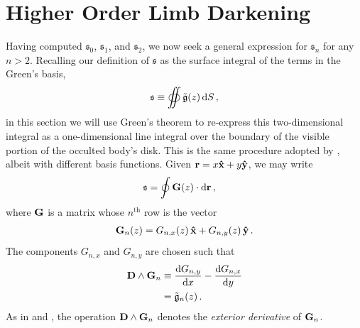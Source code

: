 \documentclass[modern,trackchanges]{aastex63}
\begin{document}
\section{Higher Order Limb Darkening}
\label{sec:higher_order}


Having computed $\mathfrak{s}_0$, $\mathfrak{s}_1$, and $\mathfrak{s}_2$,
we now seek a general expression for $\mathfrak{s}_n$ for any $n > 2$.
Recalling our definition of $\mathfrak{s}$ as the surface integral of
the terms in the Green's basis,
%
\begin{align}
    \mathfrak{s} \equiv \oiint \gbasis (z) \, \dd S \quad,
\end{align}
%
in this section we will use Green's theorem to re-express this two-dimensional
integral as a one-dimensional line integral over the boundary of the visible
portion of the occulted body's disk. This is the same procedure adopted by
\citet{starry}, albeit with different basis functions.
Given ${\mathbf{r}} = x \mathbf{\hat{x}} + y \mathbf{\hat{y}}$, we may write
%
%
\begin{align}
    \label{eq:greens}
    \mathfrak{s} &=
    \oint \bvec{G} (z) \cdot \dd \bvec{r}
    \quad,
\end{align}
%
where ${\mathbf{G}}$ is a matrix whose $n^{\mathrm{th}}$ row is the
vector
%
\begin{align}
    \label{eq:greens_n}
    \bvec{G}_n (z) = G_{n,x} (z) \, \xhat + G_{n,y} (z) \, \yhat \quad .
\end{align}
%
The components $G_{n,x}$ and $G_{n,y}$ are chosen such that
%
\begin{align}
    \label{eq:DGg}
    \bvec{D} \wedge \bvec{G}_n &\equiv \frac{\dd G_{n,y}}{\dd \x}
                                     - \frac{\dd G_{n,x}}{\dd \y} \nonumber \\
                               &= \gbasisn(z) \quad.
\end{align}
%
As in \citet{Pal2012} and \citet{starry}, the operation
${\mathbf{D}} \wedge {\ensuremath{\mathbf{G}}}_n$ denotes the
\emph{exterior derivative} of ${\mathbf{G}}_n$.
%
%
\end{document}
